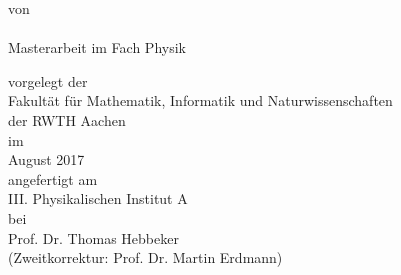 
\makeatletter
\begin{titlepage}
		\tgherosfont
		\centering
		
		\Large
		
		\vspace*{\fill}
		
		{
            \color{ctcolormain}
            \fontsize{30}{32}\selectfont
            \bfseries
            \@title
            \par
		}
		
		\vspace{24mm}
		
		\textsf{von} \\
		{\LARGE \@author} \\[32mm]
		
		Masterarbeit im Fach Physik \\[8mm]
		
		\large
		
		\textsf{vorgelegt der} \\
		Fakultät für Mathematik, Informatik und Naturwissenschaften \\der RWTH Aachen \\[8mm]
		
		\textsf{im} \\
		August 2017 \\[8mm]
		
		\textsf{angefertigt am} \\
		III. Physikalischen Institut A \\[8mm]
		
		\textsf{bei} \\
		Prof. Dr. Thomas Hebbeker \\
        (Zweitkorrektur: Prof. Dr. Martin Erdmann)
\end{titlepage}
\makeatother